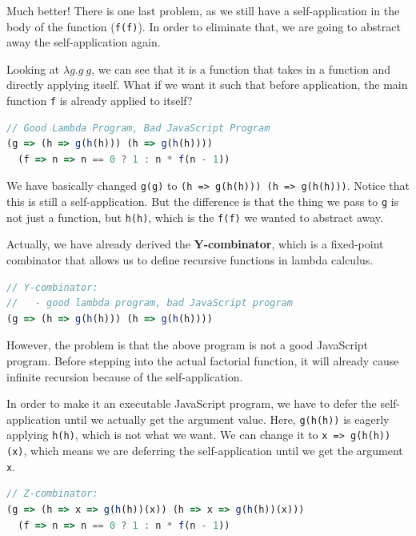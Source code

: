 \documentclass[12pt]{article}
\begin{document}
Much better!
There is one last problem, as we still have a self-application in the body of the function (\texttt{f(f)}).
In order to eliminate that, we are going to abstract away the self-application again.

Looking at $\lambda g.g~g$, we can see that it is a function that takes in a function and directly applying itself.
What if we want it such that before application, the main function \texttt{f} is already applied to itself?

\begin{lstlisting}[frame=single,language=javascript,basicstyle=\ttfamily]
// Good Lambda Program, Bad JavaScript Program
(g => (h => g(h(h))) (h => g(h(h))))
  (f => n => n == 0 ? 1 : n * f(n - 1))
\end{lstlisting}

We have basically changed \texttt{g(g)} to \texttt{(h => g(h(h))) (h => g(h(h)))}.
Notice that this is still a self-application.
But the difference is that the thing we pass to \texttt{g} is not just a function, but \texttt{h(h)}, which is the \texttt{f(f)} we wanted to abstract away.

Actually, we have already derived the \textbf{Y-combinator}, which is a fixed-point combinator that allows us to define recursive functions in lambda calculus.

\begin{lstlisting}[frame=single,language=javascript,basicstyle=\ttfamily]
// Y-combinator: 
//   - good lambda program, bad JavaScript program
(g => (h => g(h(h))) (h => g(h(h)))) 
\end{lstlisting}

However, the problem is that the above program is not a good JavaScript program.
Before stepping into the actual factorial function, it will already cause infinite recursion because of the self-application.

In order to make it an executable JavaScript program, we have to defer the self-application until we actually get the argument value.
Here, \texttt{g(h(h))} is eagerly applying \texttt{h(h)}, which is not what we want.
We can change it to \texttt{x => g(h(h))(x)}, which means we are deferring the self-application until we get the argument \texttt{x}.

\begin{lstlisting}[frame=single,language=javascript,basicstyle=\ttfamily]
// Z-combinator:
(g => (h => x => g(h(h))(x)) (h => x => g(h(h))(x)))
  (f => n => n == 0 ? 1 : n * f(n - 1))
\end{lstlisting}
\end{document}
